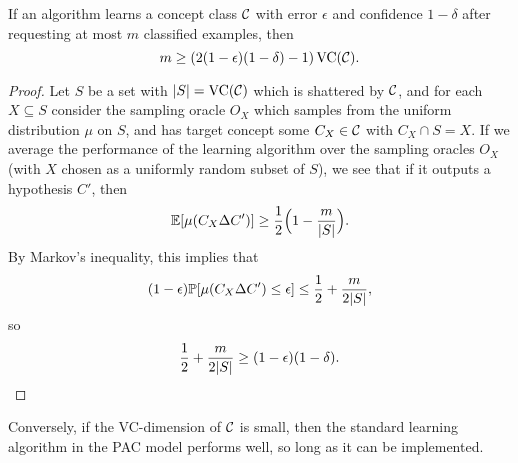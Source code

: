 \documentclass[letterpaper,11pt]{article}
\begin{document}
\begin{prop} If an algorithm learns a concept class $\mathcal{C}$ with error $\epsilon$ and confidence $1-\delta$ after requesting at most $m$ classified examples, then
\[
m \ge (2(1-\epsilon)(1-\delta) - 1)\operatorname{VC}(\mathcal{C}).
\]
\end{prop}
\begin{proof} Let $S$ be a set with $|S| = \operatorname{VC}(\mathcal{C})$ which is shattered by $\mathcal{C}$, and for each $X \subseteq S$ consider the sampling oracle $O_X$ which samples from the uniform distribution $\mu$ on $S$, and has target concept some $C_X \in \mathcal{C}$ with $C_X \cap S = X$. If we average the performance of the learning algorithm over the sampling oracles $O_X$ (with $X$ chosen as a uniformly random subset of $S$), we see that if it outputs a hypothesis $C'$, then
\[
\mathbb{E}[\mu(C_X \Delta C')] \ge \frac{1}{2}\Big(1 - \frac{m}{|S|}\Big).
\]
By Markov's inequality, this implies that
\[
(1-\epsilon)\mathbb{P}[\mu(C_X\Delta C') \le \epsilon] \le \frac{1}{2} + \frac{m}{2|S|},
\]
so
\[
\frac{1}{2} + \frac{m}{2|S|} \ge (1-\epsilon)(1-\delta).\qedhere
\]
\end{proof}

Conversely, if the VC-dimension of $\mathcal{C}$ is small, then the standard learning algorithm in the PAC model performs well, so long as it can be implemented.
\end{document}
